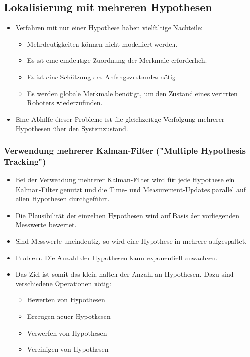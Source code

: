 \documentclass[a4paper, 11pt, accentcolor = tud3b]{tudreport}
\begin{document}
			\subsection{Lokalisierung mit mehreren Hypothesen}
				\begin{itemize}
					\item Verfahren mit nur einer Hypothese haben vielfältige Nachteile:
						\begin{itemize}
							\item Mehrdeutigkeiten können nicht modelliert werden.
							\item Es ist eine eindeutige Zuordnung der Merkmale erforderlich.
							\item Es ist eine Schätzung des Anfangszustandes nötig.
							\item Es werden globale Merkmale benötigt, um den Zustand eines verirrten Roboters wiederzufinden.
						\end{itemize}
					\item Eine Abhilfe dieser Probleme ist die gleichzeitige Verfolgung mehrerer Hypothesen über den Systemzustand.
				\end{itemize}

				\subsubsection{Verwendung mehrerer Kalman-Filter ("Multiple Hypothesis Tracking")}
					\begin{itemize}
						\item Bei der Verwendung mehrerer Kalman-Filter wird für jede Hypothese ein Kalman-Filter genutzt und die Time- und Measurement-Updates parallel auf allen Hypothesen durchgeführt.
						\item Die Plausibilität der einzelnen Hypothesen wird auf Basis der vorliegenden Messwerte bewertet.
						\item Sind Messwerte uneindeutig, so wird eine Hypothese in mehrere aufgespaltet.
						\item Problem: Die Anzahl der Hypothesen kann exponentiell anwachsen.
						\item Das Ziel ist somit das klein halten der Anzahl an Hypothesen. Dazu sind verschiedene Operationen nötig:
							\begin{itemize}
								\item Bewerten von Hypothesen
								\item Erzeugen neuer Hypothesen
								\item Verwerfen von Hypothesen
								\item Vereinigen von Hypothesen
							\end{itemize}
					\end{itemize}
				
\end{document}
